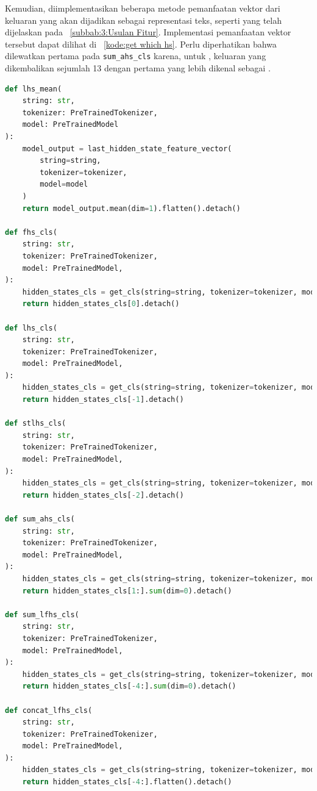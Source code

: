 Kemudian, diimplementasikan beberapa metode pemanfaatan vektor dari keluaran  yang akan dijadikan sebagai representasi teks, seperti yang telah dijelaskan pada \subbab{}~\ref{subbab:3:Usulan Fitur}. Implementasi pemanfaatan vektor tersebut dapat dilihat di \kode{}~\ref{kode:get which hs}. Perlu diperhatikan bahwa dilewatkan \hs{} pertama pada \lstinline{sum_ahs_cls} karena, untuk \bert{}, keluaran \hs{} yang dikembalikan sejumlah 13 dengan \hs{} pertama yang lebih dikenal sebagai \embedding{}.
\begin{lstlisting}[language=Python, caption={Metode pengambilan vektor dari \hs{}}, label={kode:get which hs}]
def lhs_mean(
    string: str,
    tokenizer: PreTrainedTokenizer,
    model: PreTrainedModel
):
    model_output = last_hidden_state_feature_vector(
        string=string,
        tokenizer=tokenizer,
        model=model
    )
    return model_output.mean(dim=1).flatten().detach()

def fhs_cls(
    string: str,
    tokenizer: PreTrainedTokenizer,
    model: PreTrainedModel,
):
    hidden_states_cls = get_cls(string=string, tokenizer=tokenizer, model=model)
    return hidden_states_cls[0].detach()

def lhs_cls(
    string: str,
    tokenizer: PreTrainedTokenizer,
    model: PreTrainedModel,
):
    hidden_states_cls = get_cls(string=string, tokenizer=tokenizer, model=model)
    return hidden_states_cls[-1].detach()

def stlhs_cls(
    string: str,
    tokenizer: PreTrainedTokenizer,
    model: PreTrainedModel,
):
    hidden_states_cls = get_cls(string=string, tokenizer=tokenizer, model=model)
    return hidden_states_cls[-2].detach()

def sum_ahs_cls(
    string: str,
    tokenizer: PreTrainedTokenizer,
    model: PreTrainedModel,
):
    hidden_states_cls = get_cls(string=string, tokenizer=tokenizer, model=model)
    return hidden_states_cls[1:].sum(dim=0).detach()

def sum_lfhs_cls(
    string: str,
    tokenizer: PreTrainedTokenizer,
    model: PreTrainedModel,
):
    hidden_states_cls = get_cls(string=string, tokenizer=tokenizer, model=model)
    return hidden_states_cls[-4:].sum(dim=0).detach()

def concat_lfhs_cls(
    string: str,
    tokenizer: PreTrainedTokenizer,
    model: PreTrainedModel,
):
    hidden_states_cls = get_cls(string=string, tokenizer=tokenizer, model=model)
    return hidden_states_cls[-4:].flatten().detach()
\end{lstlisting}








